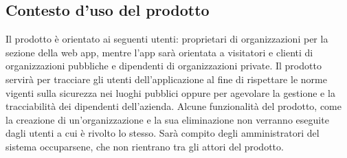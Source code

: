 \subsection{Contesto d'uso del prodotto}
Il prodotto è orientato ai seguenti utenti: proprietari di organizzazioni per la sezione della web app, mentre l'app sarà orientata a visitatori e clienti di organizzazioni pubbliche e dipendenti di organizzazioni private.
Il prodotto servirà per tracciare gli utenti dell'applicazione al fine di rispettare le norme vigenti sulla sicurezza nei luoghi pubblici oppure per agevolare la gestione e la tracciabilità dei dipendenti dell'azienda.
Alcune funzionalità del prodotto, come la creazione di un'organizzazione e la sua eliminazione non verranno eseguite dagli utenti a cui è rivolto lo stesso. Sarà compito degli amministratori del sistema \NomeProgetto{} occuparsene, che non rientrano tra gli attori del prodotto.

